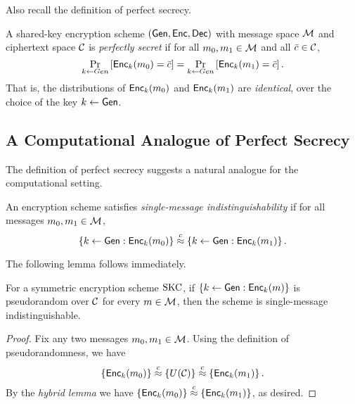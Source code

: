 \documentclass[11pt]{article}
\begin{document}
Also recall the definition of perfect secrecy.

\begin{definition}
  A shared-key encryption scheme $(\mathsf{Gen}, \mathsf{Enc}, \mathsf{Dec})$ with
  message space $\mathcal{M}$ and ciphertext space $\mathcal{C}$ is
  \textit{perfectly secret} if for all $m_0, m_1 \in \mathcal{M}$ and
  all $\bar{c} \in \mathcal{C}$,
  \[ \Pr_{k \gets Gen} \left[ \mathsf{Enc}_k(m_0) = \bar{c} \right] =
  \Pr_{k \gets Gen} \left[ \mathsf{Enc}_k(m_1) = \bar{c} \right]. \] That
  is, the distributions of $\mathsf{Enc}_{k}(m_{0})$ and
  $\mathsf{Enc}_{k}(m_{1})$ are \emph{identical}, over the choice of the
  key $k \gets \mathsf{Gen}$.
\end{definition}

\subsection{A Computational Analogue of Perfect Secrecy}
\label{sec:comp-anal-perf}

The definition of perfect secrecy suggests a natural analogue for the
computational setting.

\begin{definition}
  \label{def:single-msg-indist}
  An encryption scheme satisfies \emph{single-message
    indistinguishability} if for all messages $m_0,m_1 \in \mathcal{M}$,
  \[ \left\{ k \gets \mathsf{Gen} : \mathsf{Enc}_k(m_0) \right\} \stackrel{c}{\approx}
  \left\{ k \gets \mathsf{Gen} : \mathsf{Enc}_k(m_1) \right\}. \]
\end{definition}

The following lemma follows immediately. 

\begin{lemma}
  \label{lem:pseudorand-one_msg_secure}
  For a symmetric encryption scheme $\text{SKC}$, if $\{k \gets \mathsf{Gen} :
    \mathsf{Enc}_k(m)\}$ is pseudorandom over $\mathcal{C}$ for every $m \in
  \mathcal{M}$, then the scheme is single-message indistinguishable.
\end{lemma}

\begin{proof}
  Fix any two messages $m_0, m_1 \in \mathcal{M}$.  Using the definition
  of pseudorandomness, we have
  \[ \left\{ \mathsf{Enc}_k(m_0) \right\} \stackrel{c}{\approx} \left\{ U(\mathcal{C})
  \right\} \stackrel{c}{\approx} \left\{ \mathsf{Enc}_k(m_1) \right\}. \] By the
  \emph{hybrid lemma} we have $ \left\{ \mathsf{Enc}_k(m_0) \right\}
  \stackrel{c}{\approx} \left\{ \mathsf{Enc}_k(m_1) \right\}$, as desired.
\end{proof}
\end{document}
